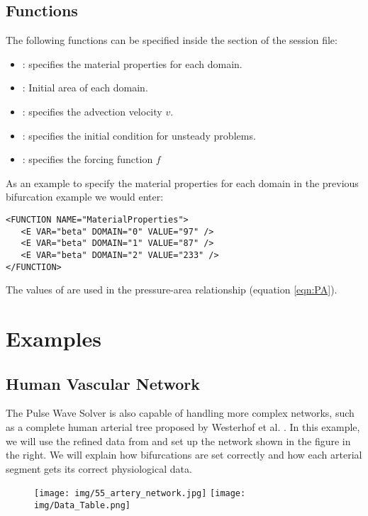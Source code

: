 \subsection{Functions}
The following functions can be specified inside the  section
of the session file:
\begin{itemize}
\item  {}: specifies the material properties for each domain.
\item  {}: Initial area of each domain.
\item {}: specifies the advection velocity $v$.
\item {}: specifies the initial condition for unsteady
 problems.
\item {}: specifies the forcing function $f$
\end{itemize}

As an example to specify the material properties for each domain in the previous bifurcation example we would enter:
\begin{lstlisting}[style=XmlStyle]
<FUNCTION NAME="MaterialProperties">
   <E VAR="beta" DOMAIN="0" VALUE="97" />
   <E VAR="beta" DOMAIN="1" VALUE="87" />
   <E VAR="beta" DOMAIN="2" VALUE="233" />
</FUNCTION>
\end{lstlisting}
The values of  are used in the pressure-area relationship (equation \ref{eqn:PA}). 

\section{Examples}

\subsection{Human Vascular Network}
The Pulse Wave Solver is also capable of handling more complex networks, such as
a complete human arterial tree proposed by Westerhof et al. \cite{We69}.
In this example, we will use the refined data from \cite{ShFoPeFr03} and set up
the network shown in the figure in the right. We will explain how bifurcations
are set correctly and how each arterial segment gets its correct physiological
data.

\begin{figure}
	\texttt{[image: img/55\_artery\_network.jpg]}
	\texttt{[image: img/Data\_Table.png]}
\end{figure}

